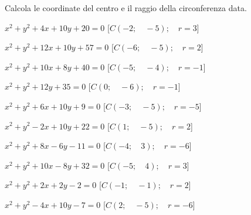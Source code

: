 \begin{esercizio}\label{ese:}
 Calcola le coordinate del centro e il raggio della circonferenza data.
 \begin{enumeratea}
  \item  \(x^2 + y^2 +4x +10y +20 = 0\)
   \hfill [\(C \left (-2; \quad -5 \right ); \quad r = 3\)]
  \item  \(x^2 + y^2 +12x +10y +57 = 0\)
   \hfill [\(C \left (-6; \quad -5 \right ); \quad r = 2\)]
  \item  \(x^2 + y^2 +10x +8y +40 = 0\)
   \hfill [\(C \left (-5; \quad -4 \right ); \quad r = -1\)]
  \item  \(x^2 + y^2 +12y +35 = 0\)
   \hfill [\(C \left (0; \quad -6 \right ); \quad r = -1\)]
  \item  \(x^2 + y^2 +6x +10y +9 = 0\)
   \hfill [\(C \left (-3; \quad -5 \right ); \quad r = -5\)]
  \item  \(x^2 + y^2 -2x +10y +22 = 0\)
   \hfill [\(C \left (1; \quad -5 \right ); \quad r = 2\)]
  \item  \(x^2 + y^2 +8x -6y -11 = 0\)
   \hfill [\(C \left (-4; \quad 3 \right ); \quad r = -6\)]
  \item  \(x^2 + y^2 +10x -8y +32 = 0\)
   \hfill [\(C \left (-5; \quad 4 \right ); \quad r = 3\)]
  \item  \(x^2 + y^2 +2x +2y -2 = 0\)
   \hfill [\(C \left (-1; \quad -1 \right ); \quad r = 2\)]
  \item  \(x^2 + y^2 -4x +10y -7 = 0\)
   \hfill [\(C \left (2; \quad -5 \right ); \quad r = -6\)]
 \end{enumeratea}
\end{esercizio}


\subsubsection*{}

